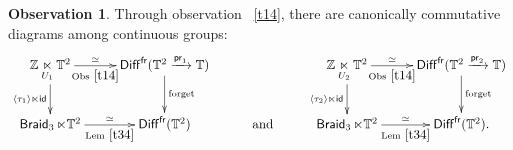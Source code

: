 \documentclass{amsart}
\theoremstyle{definition}
\newtheorem{observation}[theorem]{Observation}
\theoremstyle{remark}
\DeclareMathOperator{\pr}{\mathsf{pr}}
\DeclareMathOperator{\Aut}{\sf Aut}
\DeclareMathOperator{\Map}{{\sf Map}}
\newcommand{\lacts}{\curvearrowright}
\DeclareMathOperator{\Diff}{{\sf Diff}}
\DeclareMathOperator{\fr}{\sf fr}
\newcommand{\lag}{\langle}
\newcommand{\rag}{\rangle}
\newcommand{\xra}{\xrightarrow}
\DeclareMathOperator{\Braid}{{\sf Braid}_3}
\DeclareMathOperator{\GL}{\sf GL}
\DeclareMathOperator{\id}{\sf id}
\DeclareMathOperator{\trans}{\sf trans}
\DeclareMathOperator{\Imm}{\sf Imm}
\begin{document}






\begin{observation}
\label{t15}
Through observation ~\ref{t14}, there are canonically commutative diagrams among continuous groups:
\[
\xymatrix{
\ZZ \underset{U_{1}}\ltimes \TT^2 
\ar[r]^-{\simeq}_-{\rm Obs~\ref{t14}}
\ar[d]_-{\lag 
\tau_{1}
\rag \ltimes \id }
&
\Diff^{\fr}(\TT^2 \xra{\pr_1} \TT) 
\ar[d]^-{\rm forget}
&&
\ZZ \underset{U_{2}}\ltimes \TT^2
\ar[r]^-{\simeq}_-{\rm Obs~\ref{t14}}
\ar[d]_-{ \lag 
\tau_{2}
\rag \ltimes \id }
&
\Diff^{\fr}(\TT^2 \xra{\pr_2} \TT) 
\ar[d]^-{\rm forget}
\\
\Braid \ltimes \TT^2 
\ar[r]^-{\simeq}_-{\rm Lem~\ref{t34}}
&
\Diff^{\fr}(\TT^2)
&
\text{ and }
&
\Braid \ltimes \TT^2
\ar[r]^-{\simeq}_-{\rm Lem~\ref{t34}}
&
\Diff^{\fr}(\TT^2)
.
}
\\
\]

\end{observation}
\end{document}
